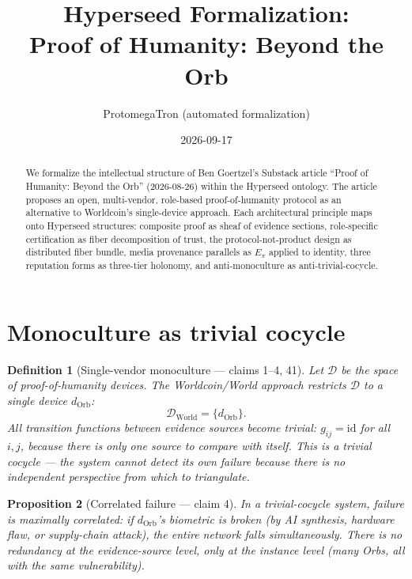 \documentclass[11pt,a4paper]{article}
\title{Hyperseed Formalization:\\
  Proof of Humanity: Beyond the Orb}
\author{ProtomegaTron (automated formalization)}
\date{2026-09-17}
\newtheorem{definition}{Definition}[section]
\newtheorem{proposition}[definition]{Proposition}
\begin{document}
\maketitle

\begin{abstract}
We formalize the intellectual structure of Ben Goertzel's Substack article
``Proof of Humanity: Beyond the Orb'' (2026-08-26) within the Hyperseed
ontology. The article proposes an open, multi-vendor, role-based
proof-of-humanity protocol as an alternative to Worldcoin's single-device
approach. Each architectural principle maps onto Hyperseed structures:
composite proof as sheaf of evidence sections, role-specific certification
as fiber decomposition of trust, the protocol-not-product design as
distributed fiber bundle, media provenance parallels as $E_\pi$ applied to
identity, three reputation forms as three-tier holonomy, and anti-monoculture
as anti-trivial-cocycle.
\end{abstract}

\tableofcontents

\section{Monoculture as trivial cocycle}
\label{sec:monoculture}

\begin{definition}[Single-vendor monoculture --- claims 1--4, 41]
\label{def:monoculture}
Let $\mathcal{D}$ be the space of proof-of-humanity devices. The Worldcoin/World
approach restricts $\mathcal{D}$ to a single device $d_{\text{Orb}}$:
\[
  \mathcal{D}_{\text{World}} = \{d_{\text{Orb}}\}.
\]
All transition functions between evidence sources become trivial:
$g_{ij} = \text{id}$ for all $i, j$, because there is only one source to
compare with itself. This is a \emph{trivial cocycle} --- the system cannot
detect its own failure because there is no independent perspective from
which to triangulate.
\end{definition}

\begin{proposition}[Correlated failure --- claim 4]
\label{prop:correlated}
In a trivial-cocycle system, failure is maximally correlated: if
$d_{\text{Orb}}$'s biometric is broken (by AI synthesis, hardware flaw,
or supply-chain attack), the entire network falls simultaneously. There
is no redundancy at the evidence-source level, only at the instance level
(many Orbs, all with the same vulnerability).
\end{proposition}
\end{document}
